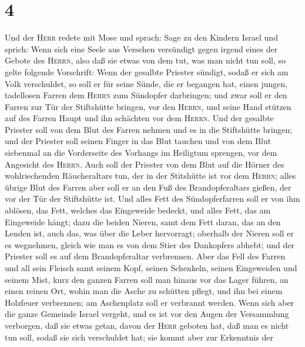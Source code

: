 \hypertarget{section-3}{%
\section{4}\label{section-3}}

 Und der \textsc{Herr} redete mit Mose und sprach:
 Sage zu den Kindern Israel und sprich: Wenn sich eine
Seele aus Versehen versündigt gegen irgend eines der Gebote des
\textsc{Herrn}, also daß sie etwas von dem tut, was man nicht tun soll,
so gelte folgende Vorschrift:  Wenn der gesalbte Priester
sündigt, sodaß er sich am Volk verschuldet, so soll er für seine Sünde,
die er begangen hat, einen jungen, tadellosen Farren dem \textsc{Herrn}
zum Sündopfer darbringen;  und zwar soll er den Farren zur
Tür der Stiftshütte bringen, vor den \textsc{Herrn}, und seine Hand
stützen auf des Farren Haupt und ihn schächten vor dem \textsc{Herrn}.
 Und der gesalbte Priester soll von dem Blut des Farren
nehmen und es in die Stiftshütte bringen;  und der
Priester soll seinen Finger in das Blut tauchen und von dem Blut
siebenmal an die Vorderseite des Vorhangs im Heiligtum sprengen, vor dem
Angesicht des \textsc{Herrn}.  Auch soll der Priester von
dem Blut auf die Hörner des wohlriechenden Räucheraltars tun, der in der
Stitshütte ist vor dem \textsc{Herrn}; alles übrige Blut des Farren aber
soll er an den Fuß des Brandopferaltars gießen, der vor der Tür der
Stiftshütte ist.  Und alles Fett des Sündopferfarren soll
er von ihm ablösen, das Fett, welches das Eingeweide bedeckt, und alles
Fett, das am Eingeweide hängt;  dazu die beiden Nieren,
samt dem Fett daran, das an den Lenden ist, auch das, was über die Leber
hervorragt; oberhalb der Nieren soll er es wegnehmen, gleich wie man es
von dem Stier des Dankopfers abhebt;  und der Priester
soll es auf dem Brandopferaltar verbrennen.  Aber das
Fell des Farren und all sein Fleisch samt seinem Kopf, seinen Schenkeln,
seinen Eingeweiden und seinem Mist,  kurz den ganzen
Farren soll man hinaus vor das Lager führen, an einen reinen Ort, wohin
man die Asche zu schütten pflegt, und ihn bei einem Holzfeuer
verbrennen; am Aschenplatz soll er verbrannt werden. 
Wenn sich aber die ganze Gemeinde Israel vergeht, und es ist vor den
Augen der Versammlung verborgen, daß sie etwas getan, davon der
\textsc{Herr} geboten hat, daß man es nicht tun soll, sodaß sie sich
verschuldet hat;  sie kommt aber zur Erkenntnis der
